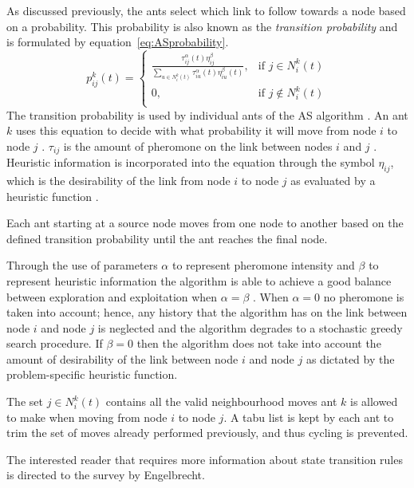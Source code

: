  As discussed previously, the ants select which link to follow towards a node based on a probability. This probability is also known as the \emph{transition probability} and is formulated by equation~\ref{eq:ASprobability}.
\begin{equation}
\label{eq:ASprobability}
p^k_{ij}(t) =
\begin{cases}
	\frac{\tau^{\alpha}_{ij}(t)\eta^{\beta}_{ij}}{\sum_{u \in N^k_i(t)} {\tau^{\alpha}_{iu}(t)\eta^{\beta}_{iu}(t)}}, &\text{if $j \in N^k_i(t)$}\\
	0, &\text{if $j \notin N^k_i(t)$}\\
\end{cases}
\end{equation}
The transition probability is used by individual ants of the \gls{AS} algorithm \cite{AntQAP,FundamentalSwarm}. An ant $k$ uses this equation to decide with what probability it will move from node $i$ to node $j$ \cite{CompuIntelligenceIntro,ACOLargeProblem}. $\tau_{ij}$ is the amount of pheromone on the link between nodes $i$ and $j$ \cite{AntsAndStigmergy,ACOLargeProblem}. Heuristic information is incorporated into the equation through the symbol $\eta_{ij}$, which is the desirability of the link from node $i$ to node $j$ as evaluated by a heuristic function \cite{AntsAndStigmergy,ACOLargeProblem}. 

Each ant starting at a source node moves from one node to another based on the defined transition probability until the ant reaches the final node.

Through the use of parameters $\alpha$ to represent pheromone intensity and $\beta$ to represent heuristic information the algorithm is able to achieve a good balance between exploration and exploitation when $\alpha=\beta$ \cite{ACOLargeProblem,AntQAP}. When $\alpha = 0$ no pheromone is taken into account; hence, any history that the algorithm has on the link between node $i$ and node $j$ is neglected and the algorithm degrades to a stochastic greedy search procedure. If $\beta = 0$ then the algorithm does not take into account the amount of desirability of the link between node $i$ and node $j$ as dictated by the problem-specific heuristic function.

The set $j \in N^k_i(t)$ contains all the valid neighbourhood moves ant $k$ is allowed to make when moving from node $i$ to node $j$. A tabu list is kept by each ant to trim the set of moves already performed previously, and thus cycling is prevented.

The interested reader that requires more information about state transition rules is directed to the survey by Engelbrecht\cite{FundamentalSwarm}.

